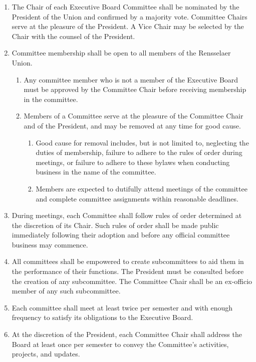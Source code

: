 
\begin{enumerate}

\item The Chair of each Executive Board Committee shall be nominated by the President of the Union and confirmed by a majority vote. Committee Chairs serve at the pleasure of the President. A Vice Chair may be selected by the Chair with the counsel of the President.

\item Committee membership shall be open to all members of the Rensselaer Union. 
\begin{enumerate}
\item Any committee member who is not a member of the Executive Board must be approved by the Committee Chair before receiving membership in the committee.
\item Members of a Committee serve at the pleasure of the Committee Chair and of the President, and may be removed at any time for good cause.
\begin{enumerate}
\item Good cause for removal includes, but is not limited to, neglecting the duties of membership, failure to adhere to the rules of order during meetings, or failure to adhere to these bylaws when conducting business in the name of the committee.
\item Members are expected to dutifully attend meetings of the committee and complete committee assignments within reasonable deadlines.
\end{enumerate}
\end{enumerate}

\item During meetings, each Committee shall follow rules of order determined at the discretion of its Chair. Such rules of order shall be made public immediately following their adoption and before any official committee business may commence.

\item All committees shall be empowered to create subcommittees to aid them in the performance of their functions. The President must be consulted before the creation of any subcommittee. The Committee Chair shall be an ex-officio member of any such subcommittee.

\item Each committee shall meet at least twice per semester and with enough frequency to satisfy its obligations to the Executive Board. 

\item At the discretion of the President, each Committee Chair shall address the Board at least once per semester to convey the Committee’s activities, projects, and updates.








\end{enumerate}